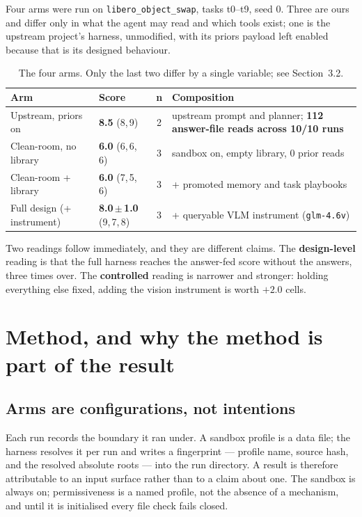 \documentclass[11pt,a4paper]{article}
\begin{document}
Four arms were run on \texttt{libero\_object\_swap}, tasks t0--t9, seed 0. Three
are ours and differ only in what the agent may read and which tools exist; one
is the upstream project's harness, unmodified, with its priors payload left
enabled because that is its designed behaviour.

\begin{table}[htbp]
\centering
\small
\begin{tabularx}{\textwidth}{@{}l l c X@{}}
\toprule
\textbf{Arm} & \textbf{Score} & \textbf{n} & \textbf{Composition} \\
\midrule
Upstream, priors on & \textbf{8.5} (8,\,9) & 2 &
  upstream prompt and planner; \textbf{112 answer-file reads across 10/10 runs} \\
Clean-room, no library & \textbf{6.0} (6,\,6,\,6) & 3 &
  sandbox on, empty library, 0 prior reads \\
Clean-room + library & \textbf{6.0} (7,\,5,\,6) & 3 &
  + promoted memory and task playbooks \\
\rowcolor{soft} Full design (+ instrument) & \textbf{8.0\,$\pm$\,1.0} (9,\,7,\,8) & 3 &
  + queryable VLM instrument (\texttt{glm-4.6v}) \\
\bottomrule
\end{tabularx}
\caption{The four arms. Only the last two differ by a single variable; see
Section~3.2.}
\end{table}

Two readings follow immediately, and they are different claims. The
\textbf{design-level} reading is that the full harness reaches the answer-fed
score without the answers, three times over. The \textbf{controlled} reading is
narrower and stronger: holding everything else fixed, adding the vision
instrument is worth $+2.0$ cells.

\section{Method, and why the method is part of the result}

\subsection{Arms are configurations, not intentions}

Each run records the boundary it ran under. A sandbox profile is a data file;
the harness resolves it per run and writes a fingerprint --- profile name,
source hash, and the resolved absolute roots --- into the run directory. A
result is therefore attributable to an input surface rather than to a claim
about one. The sandbox is always on; permissiveness is a named profile, not the
absence of a mechanism, and until it is initialised every file check fails
closed.
\end{document}
